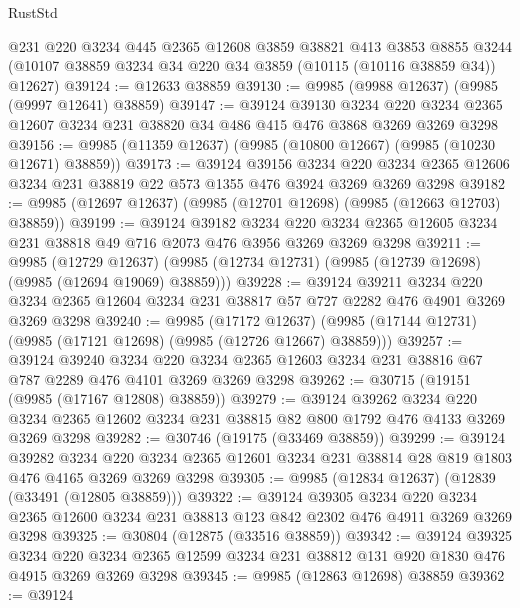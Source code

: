 \begin{lexlean}{RustStd}
\begin{coremodule}
    @231
    @220
    @3234
    @445
    @2365
    @12608
    @3859
    @38821
    @413
    @3853
    @8855
    @3244
    (@10107 @38859 @3234 @34 @220 @34 @3859 (@10115 (@10116 @38859 @34)) @12627)
@39124 := @12633 @38859
@39130 := @9985 (@9988 @12637) (@9985 (@9997 @12641) @38859)
@39147 := @39124
    @39130
    @3234
    @220
    @3234
    @2365
    @12607
    @3234
    @231
    @38820
    @34
    @486
    @415
    @476
    @3868
    @3269
    @3269
    @3298
@39156 := @9985 (@11359 @12637) (@9985 (@10800 @12667) (@9985 (@10230 @12671) @38859))
@39173 := @39124
    @39156
    @3234
    @220
    @3234
    @2365
    @12606
    @3234
    @231
    @38819
    @22
    @573
    @1355
    @476
    @3924
    @3269
    @3269
    @3298
@39182 := @9985 (@12697 @12637) (@9985 (@12701 @12698) (@9985 (@12663 @12703) @38859))
@39199 := @39124
    @39182
    @3234
    @220
    @3234
    @2365
    @12605
    @3234
    @231
    @38818
    @49
    @716
    @2073
    @476
    @3956
    @3269
    @3269
    @3298
@39211 := @9985
    (@12729 @12637)
    (@9985 (@12734 @12731) (@9985 (@12739 @12698) (@9985 (@12694 @19069) @38859)))
@39228 := @39124
    @39211
    @3234
    @220
    @3234
    @2365
    @12604
    @3234
    @231
    @38817
    @57
    @727
    @2282
    @476
    @4901
    @3269
    @3269
    @3298
@39240 := @9985
    (@17172 @12637)
    (@9985 (@17144 @12731) (@9985 (@17121 @12698) (@9985 (@12726 @12667) @38859)))
@39257 := @39124
    @39240
    @3234
    @220
    @3234
    @2365
    @12603
    @3234
    @231
    @38816
    @67
    @787
    @2289
    @476
    @4101
    @3269
    @3269
    @3298
@39262 := @30715 (@19151 (@9985 (@17167 @12808) @38859))
@39279 := @39124
    @39262
    @3234
    @220
    @3234
    @2365
    @12602
    @3234
    @231
    @38815
    @82
    @800
    @1792
    @476
    @4133
    @3269
    @3269
    @3298
@39282 := @30746 (@19175 (@33469 @38859))
@39299 := @39124
    @39282
    @3234
    @220
    @3234
    @2365
    @12601
    @3234
    @231
    @38814
    @28
    @819
    @1803
    @476
    @4165
    @3269
    @3269
    @3298
@39305 := @9985 (@12834 @12637) (@12839 (@33491 (@12805 @38859)))
@39322 := @39124
    @39305
    @3234
    @220
    @3234
    @2365
    @12600
    @3234
    @231
    @38813
    @123
    @842
    @2302
    @476
    @4911
    @3269
    @3269
    @3298
@39325 := @30804 (@12875 (@33516 @38859))
@39342 := @39124
    @39325
    @3234
    @220
    @3234
    @2365
    @12599
    @3234
    @231
    @38812
    @131
    @920
    @1830
    @476
    @4915
    @3269
    @3269
    @3298
@39345 := @9985 (@12863 @12698) @38859
@39362 := @39124

\end{coremodule}
\end{lexlean}
